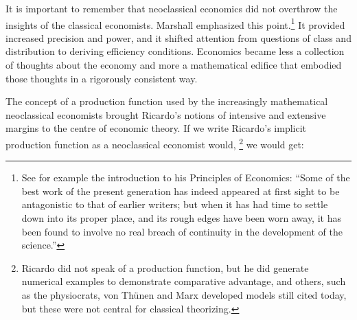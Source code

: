 It is important to remember that neoclassical economics did not overthrow the insights of the classical economists. Marshall emphasized this point.\footnote{See for example the introduction to his Principles of Economics: ``Some of the best work of the present generation has indeed appeared at first sight to be antagonistic to that of earlier writers; but when it has had time to settle down into its proper place, and its rough edges have been worn away, it has been found to involve no real breach of continuity in the development of the science.''}  It provided increased precision and power, and it shifted attention from questions of class and distribution to deriving efficiency conditions. Economics became less a collection of thoughts about the economy and more a mathematical edifice that embodied those thoughts in a rigorously consistent way. %

The concept of a production function used by the increasingly mathematical neoclassical economists brought Ricardo's notions of  intensive and extensive margins to the centre of economic theory. If we write Ricardo's implicit production function as a neoclassical economist would, \footnote{Ricardo did not speak of a production function, but he did generate numerical examples to demonstrate comparative advantage, and others, such as the physiocrats, von Th\"unen and Marx developed models still cited today, but these were not central for classical theorizing.} we would get:







